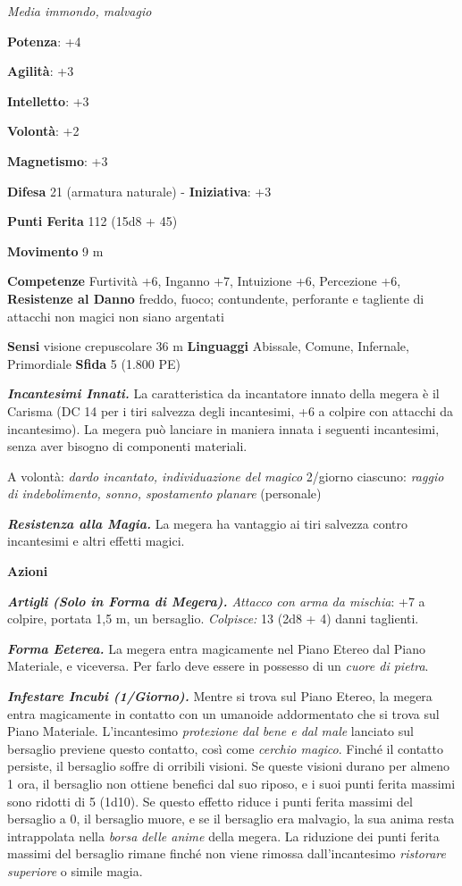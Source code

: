 \begin{multicols}{2}
\emph{Media immondo, malvagio}

\textbf{Potenza}: +4

\textbf{Agilità}: +3

\textbf{Intelletto}: +3

\textbf{Volontà}: +2

\textbf{Magnetismo}: +3

\textbf{Difesa} 21 (armatura naturale) - \textbf{Iniziativa}: +3

\textbf{Punti Ferita} 112 (15d8 + 45)

\textbf{Movimento} 9 m

\textbf{Competenze} Furtività +6, Inganno +7, Intuizione +6, Percezione +6,
\textbf{Resistenze al Danno} freddo, fuoco; contundente, perforante e
tagliente di attacchi non magici non siano argentati

\textbf{Sensi} visione crepuscolare 36 m
\textbf{Linguaggi} Abissale, Comune, Infernale, Primordiale
\textbf{Sfida} 5 (1.800 PE)

\emph{\textbf{Incantesimi Innati.}} La caratteristica da incantatore
innato della megera è il Carisma (DC 14 per i tiri salvezza degli
incantesimi, +6 a colpire con attacchi da incantesimo). La megera può
lanciare in maniera innata i seguenti incantesimi, senza aver bisogno di
componenti materiali.

A volontà: \emph{dardo incantato, individuazione del magico} 2/giorno
ciascuno: \emph{raggio di indebolimento, sonno, spostamento}
\emph{planare} (personale)

\emph{\textbf{Resistenza alla Magia.}} La megera ha vantaggio ai tiri
salvezza contro incantesimi e altri effetti magici.

\textbf{Azioni}

\emph{\textbf{Artigli (Solo in Forma di Megera).} Attacco con arma da
mischia}: +7 a colpire, portata 1,5 m, un bersaglio. \emph{Colpisce:} 13
(2d8 + 4) danni taglienti.

\emph{\textbf{Forma Eeterea.}} La megera entra magicamente nel Piano
Etereo dal Piano Materiale, e viceversa. Per farlo deve essere in
possesso di un \emph{cuore di pietra}.

\emph{\textbf{Infestare Incubi (1/Giorno).}} Mentre si trova sul Piano
Etereo, la megera entra magicamente in contatto con un umanoide
addormentato che si trova sul Piano Materiale. L'incantesimo
\emph{protezione dal bene e dal male} lanciato sul bersaglio previene
questo contatto, così come \emph{cerchio magico}. Finché il contatto
persiste, il bersaglio soffre di orribili visioni. Se queste visioni
durano per almeno 1 ora, il bersaglio non ottiene benefici dal suo
riposo, e i suoi punti ferita massimi sono ridotti di 5 (1d10). Se
questo effetto riduce i punti ferita massimi del bersaglio a 0, il
bersaglio muore, e se il bersaglio era malvagio, la sua anima resta
intrappolata nella \emph{borsa} \emph{delle anime} della megera. La
riduzione dei punti ferita massimi del bersaglio rimane finché non viene
rimossa dall'incantesimo \emph{ristorare} \emph{superiore} o simile
magia.


\end{multicols}
